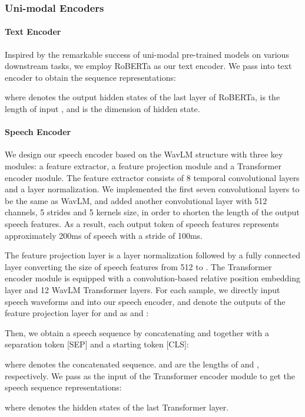 \documentclass[11pt]{article}
\begin{document}
\subsubsection{Uni-modal Encoders}
\paragraph{Text Encoder} Inspired by the remarkable success of uni-modal pre-trained models on various downstream tasks, we employ RoBERTa \citep{roberta} as our text encoder. We pass  into text encoder to obtain the sequence representations:

where  denotes the output hidden states of the last layer of RoBERTa,  is the length of input , and  is the dimension of hidden state.

\paragraph{Speech Encoder} 
We design our speech encoder based on the WavLM structure \citep{wavlm} with three key modules: a feature extractor, a feature projection module and a Transformer encoder module. The feature extractor consists of 8 temporal convolutional layers and a layer normalization. We implemented the first seven convolutional layers to be the same as WavLM, and added another convolutional layer with 512 channels, 5 strides and 5 kernels size, in order to shorten the length of the output speech features. As a result, each output token of speech features represents approximately 200ms of speech with a stride of 100ms. 

The feature projection layer is a layer normalization followed by a fully connected layer converting the size of speech features from 512 to . The Transformer encoder module is equipped with a convolution-based relative position embedding layer and 12 WavLM Transformer layers. 
For each sample, we directly input speech waveforms  and  into our speech encoder, and denote the outputs of the feature projection layer for  and  as  and :

Then, we obtain a speech sequence  by concatenating  and  together with a separation token [SEP] and a starting token [CLS]:

where  denotes the concatenated sequence.  and  are the lengths of  and , respectively. We pass  as the input of the Transformer encoder module to get the speech sequence representations:

where  denotes the hidden states of the last Transformer layer.
\end{document}
